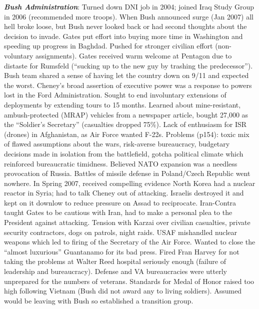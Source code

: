 \documentclass[
]{article}
\begin{document}
\textbf{\emph{Bush Administration}}: Turned down DNI job in 2004; joined
Iraq Study Group in 2006 (recommended more troops). When Bush announced
surge (Jan 2007) all hell broke loose, but Bush never looked back or had
second thoughts about the decision to invade. Gates put effort into
buying more time in Washington and speeding up progress in Baghdad.
Pushed for stronger civilian effort (non-voluntary assignments). Gates
received warm welcome at Pentagon due to distaste for Rumsfeld
(``sucking up to the new guy by trashing the predecessor''). Bush team
shared a sense of having let the country down on 9/11 and expected the
worst. Cheney's broad assertion of executive power was a response to
powers lost in the Ford Administration. Sought to end involuntary
extensions of deployments by extending tours to 15 months. Learned about
mine-resistant, ambush-protected (MRAP) vehicles from a newspaper
article, bought 27,000 as the ``Soldier's Secretary'' (casualties
dropped 75\%). Lack of enthusiasm for ISR (drones) in Afghanistan, as
Air Force wanted F-22s. Problems (p154): toxic mix of flawed assumptions
about the wars, risk-averse bureaucracy, budgetary decisions made in
isolation from the battlefield, gotcha political climate which
reinforced bureaucratic timidness. Believed NATO expansion was a
needless provocation of Russia. Battles of missile defense in
Poland/Czech Republic went nowhere. In Spring 2007, received compelling
evidence North Korea had a nuclear reactor in Syria; had to talk Cheney
out of attacking. Israelis destroyed it and kept on it downlow to reduce
pressure on Assad to reciprocate. Iran-Contra taught Gates to be
cautious with Iran, had to make a personal plea to the President against
attacking. Tension with Karzai over civilian casualties, private
security contractors, dogs on patrols, night raids. USAF mishandled
nuclear weapons which led to firing of the Secretary of the Air Force.
Wanted to close the ``almost luxurious'' Guantanamo for its bad press.
Fired Fran Harvey for not taking the problems at Walter Reed hospital
seriously enough (failure of leadership and bureaucracy). Defense and VA
bureaucracies were utterly unprepared for the numbers of veterans.
Standards for Medal of Honor raised too high following Vietnam (Bush did
not award any to living soldiers). Assumed would be leaving with Bush so
established a transition group.
\end{document}
